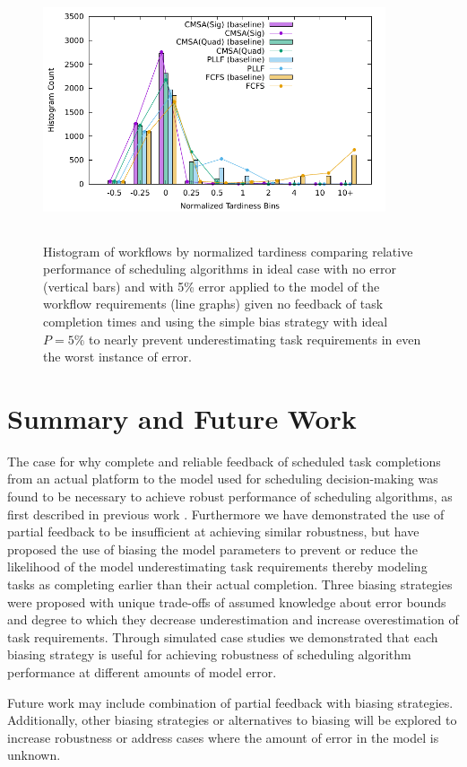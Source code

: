 \documentclass[10pt]{csce}
\begin{document}
\begin{figure}
	\begin{center}
		\includegraphics[width=0.9\textwidth,height=3in]{figures/Histogram_All_CompleteMediumAllUniformError_WithBias.pdf}
	\end{center}
	\caption{Histogram of workflows by normalized tardiness comparing
		relative performance of scheduling algorithms in ideal case with no
		error (vertical bars) and with 5\% error applied to the model of the
		workflow requirements (line graphs) given no feedback of task
		completion times and using the simple bias strategy with ideal
		$P=5\%$ to nearly prevent underestimating task requirements in even the
		worst instance of error.}
	\label{fig:nofeedback-sbias-mederror}
\end{figure}

\section{Summary and Future Work}
\label{sec:Summary}

The case for why complete and reliable feedback of scheduled task completions
from an actual platform to the model used for scheduling decision-making was
found to be necessary to achieve robust performance of scheduling algorithms,
as first described in previous work \cite{pdpta18}. Furthermore we have
demonstrated the use of partial feedback to be insufficient at achieving
similar robustness, but have proposed the use of biasing the model parameters
to prevent or reduce the likelihood of the model underestimating task
requirements thereby modeling tasks as completing earlier than their actual
completion. Three biasing strategies were proposed with unique trade-offs
of assumed knowledge about error bounds and degree to which they decrease
underestimation and increase overestimation of task requirements. Through
simulated case studies we demonstrated that each biasing strategy is useful
for achieving robustness of scheduling algorithm performance at different
amounts of model error.

Future work may include combination of partial feedback with biasing
strategies.  Additionally, other biasing strategies or alternatives to
biasing will be explored to increase robustness or address cases where
the amount of error in the model is unknown.


{}
\end{document}
